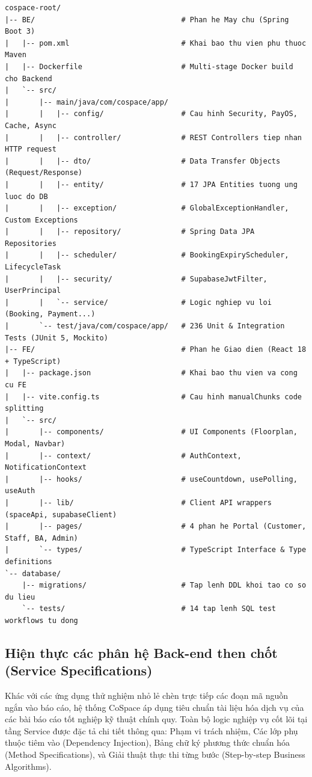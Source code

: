 \begin{verbatim}
cospace-root/
|-- BE/                                  # Phan he May chu (Spring Boot 3)
|   |-- pom.xml                          # Khai bao thu vien phu thuoc Maven
|   |-- Dockerfile                       # Multi-stage Docker build cho Backend
|   `-- src/
|       |-- main/java/com/cospace/app/
|       |   |-- config/                  # Cau hinh Security, PayOS, Cache, Async
|       |   |-- controller/              # REST Controllers tiep nhan HTTP request
|       |   |-- dto/                     # Data Transfer Objects (Request/Response)
|       |   |-- entity/                  # 17 JPA Entities tuong ung luoc do DB
|       |   |-- exception/               # GlobalExceptionHandler, Custom Exceptions
|       |   |-- repository/              # Spring Data JPA Repositories
|       |   |-- scheduler/               # BookingExpiryScheduler, LifecycleTask
|       |   |-- security/                # SupabaseJwtFilter, UserPrincipal
|       |   `-- service/                 # Logic nghiep vu loi (Booking, Payment...)
|       `-- test/java/com/cospace/app/   # 236 Unit & Integration Tests (JUnit 5, Mockito)
|-- FE/                                  # Phan he Giao dien (React 18 + TypeScript)
|   |-- package.json                     # Khai bao thu vien va cong cu FE
|   |-- vite.config.ts                   # Cau hinh manualChunks code splitting
|   `-- src/
|       |-- components/                  # UI Components (Floorplan, Modal, Navbar)
|       |-- context/                     # AuthContext, NotificationContext
|       |-- hooks/                       # useCountdown, usePolling, useAuth
|       |-- lib/                         # Client API wrappers (spaceApi, supabaseClient)
|       |-- pages/                       # 4 phan he Portal (Customer, Staff, BA, Admin)
|       `-- types/                       # TypeScript Interface & Type definitions
`-- database/
    |-- migrations/                      # Tap lenh DDL khoi tao co so du lieu
    `-- tests/                           # 14 tap lenh SQL test workflows tu dong
\end{verbatim}

\subsection{Hiện thực các phân hệ Back-end then chốt (Service Specifications)}

Khác với các ứng dụng thử nghiệm nhỏ lẻ chèn trực tiếp các đoạn mã nguồn ngắn vào báo cáo, hệ thống CoSpace áp dụng tiêu chuẩn tài liệu hóa dịch vụ của các bài báo cáo tốt nghiệp kỹ thuật chính quy. Toàn bộ logic nghiệp vụ cốt lõi tại tầng Service được đặc tả chi tiết thông qua: Phạm vi trách nhiệm, Các lớp phụ thuộc tiêm vào (Dependency Injection), Bảng chữ ký phương thức chuẩn hóa (Method Specifications), và Giải thuật thực thi từng bước (Step-by-step Business Algorithms).

